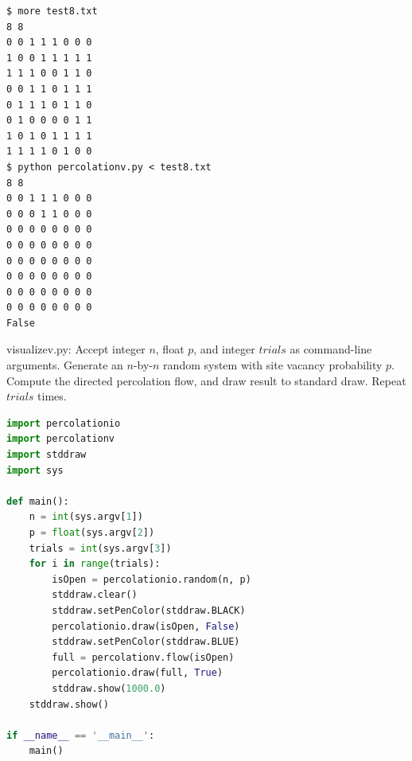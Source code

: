 \documentclass[8pt,a4paper,compress,handout]{beamer}
\begin{document}
\begin{frame}[fragile]
\begin{lstlisting}[language={}]
$ more test8.txt 
8 8
0 0 1 1 1 0 0 0
1 0 0 1 1 1 1 1
1 1 1 0 0 1 1 0
0 0 1 1 0 1 1 1
0 1 1 1 0 1 1 0
0 1 0 0 0 0 1 1
1 0 1 0 1 1 1 1
1 1 1 1 0 1 0 0
$ python percolationv.py < test8.txt 
8 8
0 0 1 1 1 0 0 0 
0 0 0 1 1 0 0 0 
0 0 0 0 0 0 0 0 
0 0 0 0 0 0 0 0 
0 0 0 0 0 0 0 0 
0 0 0 0 0 0 0 0 
0 0 0 0 0 0 0 0 
0 0 0 0 0 0 0 0 
False
\end{lstlisting}
\end{frame}

\begin{frame}[fragile]
\begin{framed}
\tiny visualizev.py: Accept integer $n$, float $p$, and integer $trials$ as command-line arguments. Generate an $n$-by-$n$ random system with site vacancy probability $p$. Compute the directed percolation flow, and draw result to standard draw. Repeat $trials$ times.
\end{framed}

\begin{lstlisting}[language=Python]
import percolationio
import percolationv
import stddraw
import sys

def main():
    n = int(sys.argv[1])
    p = float(sys.argv[2])
    trials = int(sys.argv[3])
    for i in range(trials):
        isOpen = percolationio.random(n, p)
        stddraw.clear()
        stddraw.setPenColor(stddraw.BLACK)
        percolationio.draw(isOpen, False)
        stddraw.setPenColor(stddraw.BLUE)
        full = percolationv.flow(isOpen)
        percolationio.draw(full, True)
        stddraw.show(1000.0)
    stddraw.show()

if __name__ == '__main__':
    main()
\end{lstlisting}
\end{frame}
\end{document}
